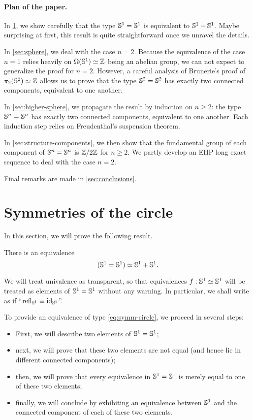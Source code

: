 \documentclass[english,a4paper]{lmcs}
\begin{document}
\paragraph{Plan of the paper.}
In \cref{sec:circle-case}, we show carefully that the type ${{\mathbb S^{1}}} = {{\mathbb S^{1}}}$
is equivalent to ${{\mathbb S^{1}}} + {{\mathbb S^{1}}}$. Maybe surprising at first, this result
is quite straightforward once we unravel the details.

In \cref{sec:sphere}, we deal with the case $n=2$. Because the
equivalence of the case $n=1$ relies heavily on $\Omega({{\mathbb S^{1}}})\simeq \mathbb{Z}$
being an abelian group, we can not expect to generalize the proof for
$n=2$. However, a careful analysis of Brunerie's proof of
$\pi_2({{\mathbb S^{2}}}) \simeq \mathbb{Z}$ allows us to prove that the type ${{\mathbb S^{2}}}={{\mathbb S^{2}}}$ has
exactly two connected components, equivalent to one another.

In \cref{sec:higher-sphere}, we propagate the result by induction on
$n\geq 2$: the type ${\mathbb S^{n}} = {\mathbb S^{n}}$ has exactly two connected
components, equivalent to one another. Each induction step relies on
Freudenthal's suspension theorem.

In \cref{sec:structure-components}, we then show that the fundamental group
of each component of ${\mathbb S^{n}} = {\mathbb S^{n}}$ is $\mathbb{Z}/2\mathbb{Z}$ for $n\ge2$.
We partly develop an EHP long exact sequence to deal with the case $n=2$.

Final remarks are made in \cref{sec:conclusions}.

\section{Symmetries of the circle}
\label{sec:circle-case}%

In this section, we will prove the following result.
\begin{thm}
  \label{thm:symmetries-of-S1}
  There is an equivalence
  \begin{equation}
    \label{eq:symm-circle}%
    (\Sc = \Sc) \weq \Sc+\Sc.
  \end{equation}
\end{thm}
We will treat univalence as transparent, so that equivalences
$f:{{\mathbb S^{1}}}\simeq {{\mathbb S^{1}}}$ will be treated as elements of ${{\mathbb S^{1}}}={{\mathbb S^{1}}}$ without any
warning. In particular, we shall write as if
``$\mathop{{\mathrm{refl}}_{{{\mathbb S^{1}}}}} \equiv \mathord{\mathrm{id}}_{{\mathbb S^{1}}}$''.

To provide an equivalence of type \cref{eq:symm-circle}, we proceed
in several steps:
\begin{itemize}
\item First, we will describe two elements of ${{\mathbb S^{1}}}={{\mathbb S^{1}}}$;
\item next, we will prove that these two elements are not equal (and
hence lie in different connected components);
\item then, we will prove that every equivalence in ${{\mathbb S^{1}}}={{\mathbb S^{1}}}$ is
  merely equal to one of these two elements;
\item finally, we will conclude by exhibiting an equivalence between
  ${{\mathbb S^{1}}}$ and the connected component of each of these two elements.
\end{itemize}
\end{document}
